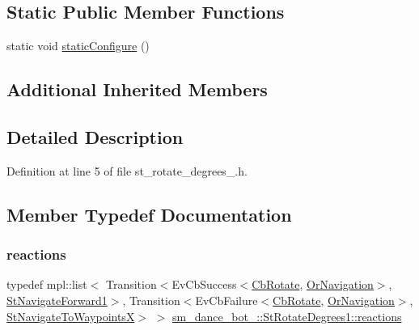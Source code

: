 \subsection*{Static Public Member Functions}
\begin{DoxyCompactItemize}
\item 
static void \hyperlink{structsm__dance__bot__2_1_1StRotateDegrees1_aa1ac1bb8334e31e0550df507ddd8e8c0}{static\+Configure} ()
\end{DoxyCompactItemize}
\subsection*{Additional Inherited Members}


\subsection{Detailed Description}


Definition at line 5 of file st\+\_\+rotate\+\_\+degrees\+\_.\+h.



\subsection{Member Typedef Documentation}
\mbox{\label{structsm__dance__bot__2_1_1StRotateDegrees1_a3029207ceb9815658e5d07480dd754f0}} 
\subsubsection{\texorpdfstring{reactions}{reactions}}
{\footnotesize\ttfamily typedef mpl\+::list$<$ Transition$<$Ev\+Cb\+Success$<$\hyperlink{classcl__move__base__z_1_1CbRotate}{Cb\+Rotate}, \hyperlink{classsm__dance__bot__2_1_1OrNavigation}{Or\+Navigation}$>$, \hyperlink{structsm__dance__bot__2_1_1StNavigateForward1}{St\+Navigate\+Forward1}$>$, Transition$<$Ev\+Cb\+Failure$<$\hyperlink{classcl__move__base__z_1_1CbRotate}{Cb\+Rotate}, \hyperlink{classsm__dance__bot__2_1_1OrNavigation}{Or\+Navigation}$>$, \hyperlink{structsm__dance__bot__2_1_1StNavigateToWaypointsX}{St\+Navigate\+To\+WaypointsX}$>$ $>$ \hyperlink{structsm__dance__bot__2_1_1StRotateDegrees1_a3029207ceb9815658e5d07480dd754f0}{sm\+\_\+dance\+\_\+bot\+\_\+::\+St\+Rotate\+Degrees1\+::reactions}}



